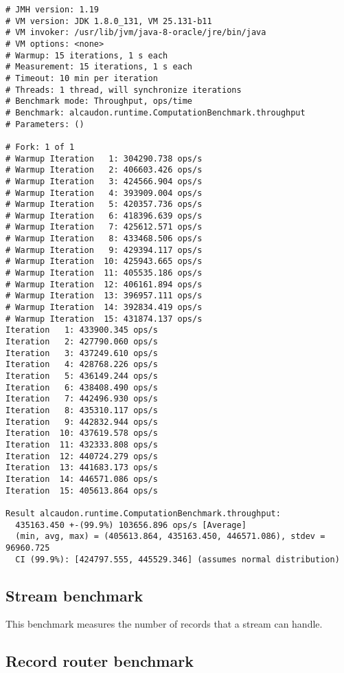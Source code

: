 \begin{lstlisting}
# JMH version: 1.19
# VM version: JDK 1.8.0_131, VM 25.131-b11
# VM invoker: /usr/lib/jvm/java-8-oracle/jre/bin/java
# VM options: <none>
# Warmup: 15 iterations, 1 s each
# Measurement: 15 iterations, 1 s each
# Timeout: 10 min per iteration
# Threads: 1 thread, will synchronize iterations
# Benchmark mode: Throughput, ops/time
# Benchmark: alcaudon.runtime.ComputationBenchmark.throughput
# Parameters: ()

# Fork: 1 of 1
# Warmup Iteration   1: 304290.738 ops/s
# Warmup Iteration   2: 406603.426 ops/s
# Warmup Iteration   3: 424566.904 ops/s
# Warmup Iteration   4: 393909.004 ops/s
# Warmup Iteration   5: 420357.736 ops/s
# Warmup Iteration   6: 418396.639 ops/s
# Warmup Iteration   7: 425612.571 ops/s
# Warmup Iteration   8: 433468.506 ops/s
# Warmup Iteration   9: 429394.117 ops/s
# Warmup Iteration  10: 425943.665 ops/s
# Warmup Iteration  11: 405535.186 ops/s
# Warmup Iteration  12: 406161.894 ops/s
# Warmup Iteration  13: 396957.111 ops/s
# Warmup Iteration  14: 392834.419 ops/s
# Warmup Iteration  15: 431874.137 ops/s
Iteration   1: 433900.345 ops/s
Iteration   2: 427790.060 ops/s
Iteration   3: 437249.610 ops/s
Iteration   4: 428768.226 ops/s
Iteration   5: 436149.244 ops/s
Iteration   6: 438408.490 ops/s
Iteration   7: 442496.930 ops/s
Iteration   8: 435310.117 ops/s
Iteration   9: 442832.944 ops/s
Iteration  10: 437619.578 ops/s
Iteration  11: 432333.808 ops/s
Iteration  12: 440724.279 ops/s
Iteration  13: 441683.173 ops/s
Iteration  14: 446571.086 ops/s
Iteration  15: 405613.864 ops/s

Result alcaudon.runtime.ComputationBenchmark.throughput:
  435163.450 +-(99.9%) 103656.896 ops/s [Average]
  (min, avg, max) = (405613.864, 435163.450, 446571.086), stdev = 96960.725
  CI (99.9%): [424797.555, 445529.346] (assumes normal distribution)
\end{lstlisting}

\subsection{Stream benchmark}

This benchmark measures the number of records that a stream can handle.


\subsection{Record router benchmark}

